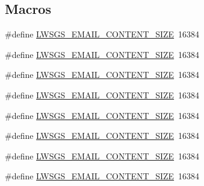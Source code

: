 \subsection*{Macros}
\begin{DoxyCompactItemize}
\item 
\#define \hyperlink{group__generic-sessions_ga22e0d172d9bc26a18f80774f3950b952}{L\+W\+S\+G\+S\+\_\+\+E\+M\+A\+I\+L\+\_\+\+C\+O\+N\+T\+E\+N\+T\+\_\+\+S\+I\+ZE}~16384
\item 
\#define \hyperlink{group__generic-sessions_ga22e0d172d9bc26a18f80774f3950b952}{L\+W\+S\+G\+S\+\_\+\+E\+M\+A\+I\+L\+\_\+\+C\+O\+N\+T\+E\+N\+T\+\_\+\+S\+I\+ZE}~16384
\item 
\#define \hyperlink{group__generic-sessions_ga22e0d172d9bc26a18f80774f3950b952}{L\+W\+S\+G\+S\+\_\+\+E\+M\+A\+I\+L\+\_\+\+C\+O\+N\+T\+E\+N\+T\+\_\+\+S\+I\+ZE}~16384
\item 
\#define \hyperlink{group__generic-sessions_ga22e0d172d9bc26a18f80774f3950b952}{L\+W\+S\+G\+S\+\_\+\+E\+M\+A\+I\+L\+\_\+\+C\+O\+N\+T\+E\+N\+T\+\_\+\+S\+I\+ZE}~16384
\item 
\#define \hyperlink{group__generic-sessions_ga22e0d172d9bc26a18f80774f3950b952}{L\+W\+S\+G\+S\+\_\+\+E\+M\+A\+I\+L\+\_\+\+C\+O\+N\+T\+E\+N\+T\+\_\+\+S\+I\+ZE}~16384
\item 
\#define \hyperlink{group__generic-sessions_ga22e0d172d9bc26a18f80774f3950b952}{L\+W\+S\+G\+S\+\_\+\+E\+M\+A\+I\+L\+\_\+\+C\+O\+N\+T\+E\+N\+T\+\_\+\+S\+I\+ZE}~16384
\item 
\#define \hyperlink{group__generic-sessions_ga22e0d172d9bc26a18f80774f3950b952}{L\+W\+S\+G\+S\+\_\+\+E\+M\+A\+I\+L\+\_\+\+C\+O\+N\+T\+E\+N\+T\+\_\+\+S\+I\+ZE}~16384
\item 
\#define \hyperlink{group__generic-sessions_ga22e0d172d9bc26a18f80774f3950b952}{L\+W\+S\+G\+S\+\_\+\+E\+M\+A\+I\+L\+\_\+\+C\+O\+N\+T\+E\+N\+T\+\_\+\+S\+I\+ZE}~16384
\end{DoxyCompactItemize}

